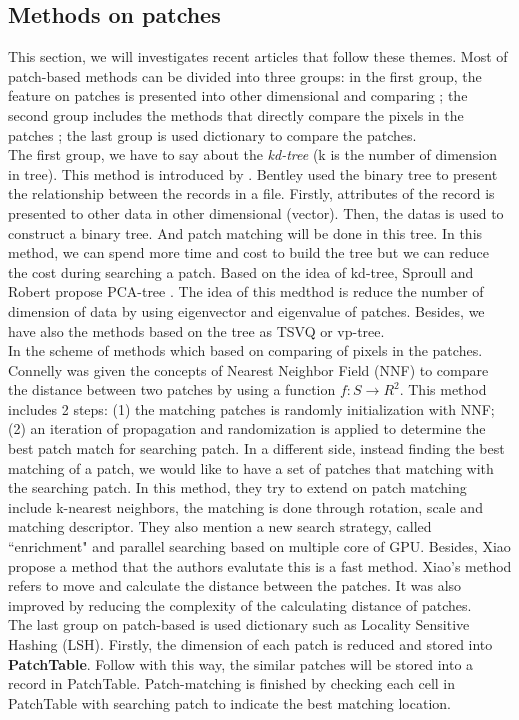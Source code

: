 \subsection{Methods on patches}
This section, we will investigates recent articles that follow these themes. Most of patch-based methods can be divided into three groups: in the first group, the feature on patches is presented into other dimensional and comparing \cite{bentley1975multidimensional, sproull1991refinements, niyogi1996example, kumar2008good}; the second group includes the methods that directly compare the pixels in the patches \cite{barnes2010generalized, barnes2009patchmatch, xiao2011fast}; the last group is used dictionary to compare the patches\cite{datar2004locality}.\\[0.2cm]
The first group, we have to say about the \textit{kd-tree} (k is the number of dimension in tree). This method is introduced by \cite{bentley1975multidimensional}. Bentley used the binary tree to present the relationship between the records in a file. Firstly, attributes of the record is presented to other data in other dimensional (vector). Then, the datas is used to construct a binary tree. And patch matching will be done in this tree. In this method, we can spend more time and cost to build the tree but we can reduce the cost during searching a patch. Based on the idea of kd-tree, Sproull and Robert propose PCA-tree \cite{sproull1991refinements}. The idea of this medthod is reduce the number of dimension of data by using eigenvector and eigenvalue of patches. Besides, we have also the methods based on the tree as TSVQ \cite{niyogi1996example} or vp-tree\cite{kumar2008good}.\\[0.2cm]
In the scheme of methods which based on comparing of pixels in the patches. Connelly\cite{barnes2009patchmatch} was given the concepts of Nearest Neighbor Field (NNF) to compare the distance between two patches by using a function $f: S \rightarrow R^2$. This method includes 2 steps: (1) the matching patches is randomly initialization with NNF; (2) an iteration of propagation and randomization is applied to determine the best patch match for searching patch. In a different side, instead finding the best matching of a patch, we would like to have a set of patches that matching with the searching patch\cite{barnes2010generalized}. In this method, they try to extend on patch matching include k-nearest neighbors, the matching is done through rotation, scale and matching descriptor. They also mention a new search strategy, called ``enrichment" and parallel searching based on multiple core of GPU. Besides, Xiao\cite{xiao2011fast} propose a method that the authors evalutate this is a fast method. Xiao's method refers to move and calculate the distance between the patches. It was also improved by reducing the complexity of the calculating distance of patches.\\[0.2cm]
The last group on patch-based is used dictionary such as Locality Sensitive Hashing (LSH)\cite{datar2004locality}. Firstly, the dimension of each patch is reduced and stored into \textbf{PatchTable}. Follow with this way, the similar patches will be stored into a record in PatchTable. Patch-matching is finished by checking each cell in PatchTable with searching patch to indicate the best matching location.
